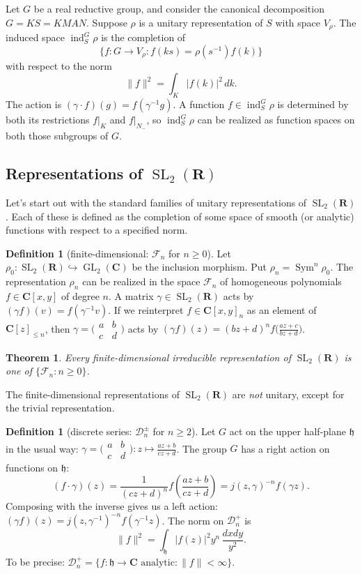 \documentclass{article}
\DeclareMathOperator{\generallinear}{GL}
\DeclareMathOperator{\induce}{ind}
\DeclareMathOperator{\speciallinear}{SL}
\DeclareMathOperator{\symmetricpower}{Sym}
\newcommand{\dC}{\mathbf{C}}
\newcommand{\dR}{\mathbf{R}}
\newcommand{\fh}{\mathfrak{h}}
\newcommand{\discreteseries}{\mathcal{D}}
\newcommand{\finitedimensional}{\mathcal{F}}
\newcommand{\smat}[4]{\bigl(\begin{smallmatrix} {#1} & {#2} \\ {#3} & {#4} \end{smallmatrix} \bigr)}
\newtheorem{theorem}[subsubsection]{Theorem}
\theoremstyle{definition}
\newtheorem{definition}[subsubsection]{Definition}
\begin{document}
Let $G$ be a real reductive group, and consider the canonical decomposition 
$G = K S = K M A N$. Suppose $\rho$ is a unitary representation of $S$ with 
space $V_\rho$. The induced space $\induce_S^G\rho$ is the completion of 
\[
  \{f:G\to V_\rho:f(k s) = \rho(s^{-1}) f(k)\} 
\]
with respect to the norm 
\[
  \|f\|^2 = \int_K |f(k)|^2\, dk .
\]
The action is $(\gamma \cdot f)(g) = f(\gamma^{-1} g)$. A function 
$f\in \induce_S^G\rho$ is determined by both its restrictions 
$f|_K$ and $f|_{N_-}$, so $\induce_S^G\rho$ can be realized as function spaces 
on both those subgroups of $G$. 


\subsection{Representations of \texorpdfstring{$\speciallinear_2(\dR)$}{SL2(R)}}

Let's start out with the standard families of unitary representations of 
$\speciallinear_2(\dR)$. Each of these is defined as the completion of some 
space of smooth (or analytic) functions with respect to a specified norm. 

\begin{definition}[finite-dimensional: $\finitedimensional_n$ for $n\geqslant 0$]
Let $\rho_0:\speciallinear_2(\dR)\hookrightarrow\generallinear_2(\dC)$ be the 
inclusion morphism. Put $\rho_n = \symmetricpower^n \rho_0$. The representation 
$\rho_n$ can be realized in the space $\finitedimensional_n$ of homogeneous 
polynomials $f\in \dC[x,y]$ of degree $n$. A matrix 
$\gamma\in \speciallinear_2(\dR)$ acts by $(\gamma f)(v) = f(\gamma^{-1} v)$. 
If we reinterpret $f\in \dC[x,y]_n$ as an element of $\dC[z]_{\leqslant n}$, 
then $\gamma=\smat a b c d$ acts by 
$(\gamma f)(z) = (b z+d)^n f\bigl(\frac{a z+c}{b z+d}\bigr)$. 
\end{definition}

\begin{theorem}
Every finite-dimensional irreducible representation of $\speciallinear_2(\dR)$ 
is one of $\{\finitedimensional_n:n\geqslant 0\}$. 
\end{theorem}

The finite-dimensional representations of $\speciallinear_2(\dR)$ are 
\emph{not} unitary, except for the trivial representation. 

\begin{definition}[discrete series: $\discreteseries_n^\pm$ for $n\geqslant 2$]
Let $G$ act on the upper half-plane $\fh$ in the usual way: 
$\gamma = \smat a b c d:z\mapsto\frac{a z+b}{c z+d}$. The group $G$ has a 
right action on functions on $\fh$: 
\[
  (f\cdot \gamma)(z) = \frac{1}{(c z+d)^n} f\left(\frac{a z+b}{c z+d}\right) = j(z,\gamma)^{-n} f(\gamma z) .
\]
Composing with the inverse gives us a left action: 
$(\gamma f)(z) = j(z,\gamma^{-1})^{-n} f(\gamma^{-1} z)$. The norm on 
$\discreteseries_n^+$ is 
\[
  \|f\|^2 = \int_\fh |f(z)|^2 y^n \, \frac{dx dy}{y^2}  .
\]
To be precise: 
$\discreteseries_n^+ = \{f:\fh\to \dC\text{ analytic}: \|f\|<\infty\}$. 
\end{definition}
\end{document}
